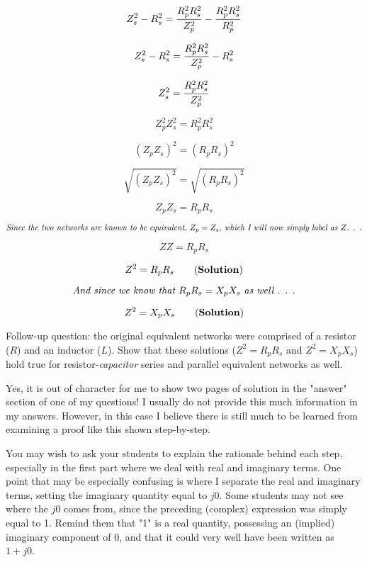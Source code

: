 $$Z_s^2 - R_s^2 = {R_p^2 R_s^2 \over Z_p^2} - {R_p^2 R_s^2 \over R_p^2}$$

$$Z_s^2 - R_s^2 = {R_p^2 R_s^2 \over Z_p^2} - R_s^2$$

$$Z_s^2 = {R_p^2 R_s^2 \over Z_p^2}$$

$$Z_p^2 Z_s^2 = R_p^2 R_s^2$$

$$(Z_p Z_s)^2 = (R_p R_s)^2$$

$$\sqrt{(Z_p Z_s)^2} = \sqrt{(R_p R_s)^2}$$

$$Z_p Z_s = R_p R_s$$

$$\hbox{\it Since the two networks are known to be equivalent, } Z_p = Z_s \hbox{\it , which I will now simply label as }Z \hbox{\it . . .}$$

$$Z Z = R_p R_s$$

$$Z^2 = R_p R_s \hbox{\hskip 20pt ({\bf Solution}})$$

$$\hbox{\it And since we know that } R_p R_s = X_p X_s \hbox{ \it as well . . .} $$

$$Z^2 = X_p X_s \hbox{\hskip 20pt ({\bf Solution})}$$

\vskip 10pt

Follow-up question: the original equivalent networks were comprised of a resistor ($R$) and an inductor ($L$).  Show that these solutions ($Z^2 = R_p R_s$ and $Z^2 = X_p X_s$) hold true for resistor-{\it capacitor} series and parallel equivalent networks as well.







Yes, it is out of character for me to show two pages of solution in the "answer" section of one of my questions!  I usually do not provide this much information in my answers.  However, in this case I believe there is still much to be learned from examining a proof like this shown step-by-step.  

You may wish to ask your students to explain the rationale behind each step, especially in the first part where we deal with real and imaginary terms.  One point that may be especially confusing is where I separate the real and imaginary terms, setting the imaginary quantity equal to $j0$.  Some students may not see where the $j0$ comes from, since the preceding (complex) expression was simply equal to 1.  Remind them that "1" is a real quantity, possessing an (implied) imaginary component of 0, and that it could very well have been written as $1 + j0$.




